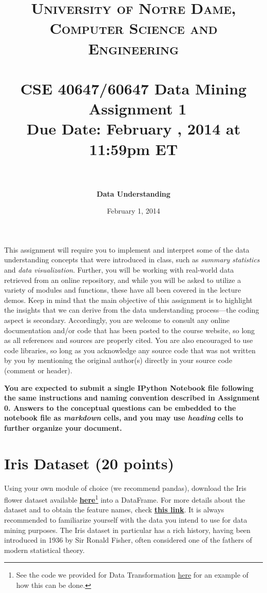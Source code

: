 \documentclass[paper=a4, fontsize=11pt]{scrartcl} %
\title{	
\normalfont \normalsize
\textsc{University of Notre Dame, Computer Science and Engineering} \\ [25pt] %
\horrule{0.5pt} \\[0.4cm] %
\huge CSE 40647/60647  Data Mining \textemdash~Assignment 1\\Due Date: February \nth{10}, 2014 at 11:59pm ET \\ %
\horrule{2pt} \\[0.5cm] %
}
\author{\textbf{Data Understanding}} %
\date{\normalsize{February 1, 2014}} %
\numberwithin{equation}{section} %
\numberwithin{figure}{section} %
\numberwithin{table}{section} %
\begin{document}
\maketitle %


This assignment will require you to implement and interpret some of the data understanding concepts that were introduced in class, such as \textit{summary statistics} and \textit{data visualization}. Further, you will be working with real-world data retrieved from an online repository, and while you will be asked to utilize a variety of modules and functions, these have all been covered in the lecture demos. Keep in mind that the main objective of this assignment is to highlight the insights that we can derive from the data understanding process---the coding aspect is secondary. Accordingly, you are welcome to consult any online documentation and/or code that has been posted to the course website, so long as all references and sources are properly cited. You are also encouraged to use code libraries, so long as you acknowledge any source code that was not written by you by mentioning the original author(s) directly in your source code (comment or header).
\linebreak
\vspace{1pt}

\textbf{You are expected to submit a single IPython Notebook file following the same instructions and naming convention described in Assignment 0. Answers to the conceptual questions can be embedded to the notebook file as \textit{markdown} cells, and you may use \textit{heading} cells to further organize your document.}

\section{Iris Dataset (20 points)}

Using your own module of choice (we recommend pandas), download the Iris flower dataset available \textbf{\href{http://archive.ics.uci.edu/ml/machine-learning-databases/iris/iris.data}{here}}\footnote{See the code we provided for Data Transformation \href{http://nbviewer.ipython.org/github/cse40647/cse40647/blob/sp.14/07\%20-\%20Data\%20Transformation.ipynb}{here} for an example of how this can be done.} into a DataFrame. For more details about the dataset and to obtain the feature names, check \textbf{\href{http://archive.ics.uci.edu/ml/datasets/Iris}{this link}}. It is always recommended to familiarize yourself with the data you intend to use for data mining purposes. The Iris dataset in particular has a rich history, having been introduced in 1936 by Sir Ronald Fisher, often considered one of the fathers of modern statistical theory.
\end{document}
